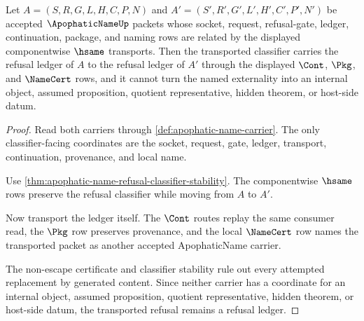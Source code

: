\begin{theorem}
\label{thm:apophatic-name-classifier-refusal-transport}
Let $A=(S,R,G,L,H,C,P,N)$ and $A'=(S',R',G',L',H',C',P',N')$ be accepted $\ApophaticNameUp$ packets whose socket, request, refusal-gate, ledger, continuation, package, and naming rows are related by the displayed componentwise $\hsame$ transports. Then the transported classifier carries the refusal ledger of $A$ to the refusal ledger of $A'$ through the displayed $\Cont$, $\Pkg$, and $\NameCert$ rows, and it cannot turn the named externality into an internal object, assumed proposition, quotient representative, hidden theorem, or host-side datum.
\end{theorem}
\begin{proof}
Read both carriers through \autoref{def:apophatic-name-carrier}. The only classifier-facing coordinates are the socket, request, gate, ledger, transport, continuation, provenance, and local name.

Use \autoref{thm:apophatic-name-refusal-classifier-stability}. The componentwise $\hsame$ rows preserve the refusal classifier while moving from $A$ to $A'$.

Now transport the ledger itself. The $\Cont$ routes replay the same consumer read, the $\Pkg$ row preserves provenance, and the local $\NameCert$ row names the transported packet as another accepted ApophaticName carrier.

The non-escape certificate and classifier stability rule out every attempted replacement by generated content. Since neither carrier has a coordinate for an internal object, assumed proposition, quotient representative, hidden theorem, or host-side datum, the transported refusal remains a refusal ledger.
\end{proof}

